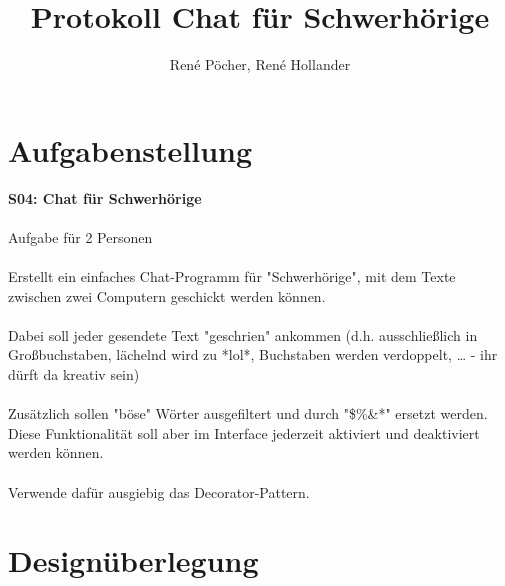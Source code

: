 \documentclass[a4paper, 11pt]{article}
\title{Protokoll Chat für Schwerhörige}
\author{René Pöcher, René Hollander}
\begin{document}
\maketitle

\newpage  \tableofcontents \newpage

\section{Aufgabenstellung}


\textbf{S04: Chat für Schwerhörige}
\\\\
Aufgabe für 2 Personen
\\\\
Erstellt ein einfaches Chat-Programm für "Schwerhörige", mit dem Texte zwischen zwei Computern geschickt werden können.
\\\\
Dabei soll jeder gesendete Text "geschrien" ankommen (d.h. ausschließlich in Großbuchstaben, lächelnd wird zu *lol*, Buchstaben werden verdoppelt, … - ihr dürft da kreativ sein)
\\\\
Zusätzlich sollen "böse" Wörter ausgefiltert und durch "\$\%\&*" ersetzt werden. Diese Funktionalität soll aber im Interface jederzeit aktiviert und deaktiviert werden können.
\\\\
Verwende dafür ausgiebig das Decorator-Pattern.

 \newpage


\section{Designüberlegung}
\end{document}
